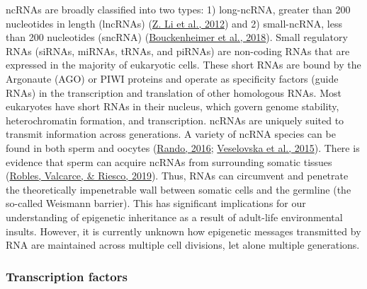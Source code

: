 \documentclass[12pt,twoside]{reedthesis}
\begin{document}
ncRNAs are broadly classified into two types: 1) long-ncRNA, greater
than 200 nucleotides in length (lncRNAs) (\protect\hyperlink{ref-li2012}{Z. Li et al., 2012}) and 2) small-ncRNA,
less than 200 nucleotides (sncRNA) (\protect\hyperlink{ref-bouckenheimer2018}{Bouckenheimer et al., 2018}). Small
regulatory RNAs (siRNAs, miRNAs, tRNAs, and piRNAs) are non-coding RNAs
that are expressed in the majority of eukaryotic cells. These short RNAs
are bound by the Argonaute (AGO) or PIWI proteins and operate as
specificity factors (guide RNAs) in the transcription and translation of
other homologous RNAs. Most eukaryotes have short RNAs in their nucleus,
which govern genome stability, heterochromatin formation, and
transcription. ncRNAs are uniquely suited to transmit information across
generations. A variety of ncRNA species can be found in both sperm and
oocytes (\protect\hyperlink{ref-rando2016}{Rando, 2016}; \protect\hyperlink{ref-veselovska2015}{Veselovska et al., 2015}). There is evidence that sperm can
acquire ncRNAs from surrounding somatic tissues (\protect\hyperlink{ref-robles2019}{Robles, Valcarce, \& Riesco, 2019}). Thus,
RNAs can circumvent and penetrate the theoretically impenetrable wall
between somatic cells and the germline (the so-called Weismann barrier).
This has significant implications for our understanding of epigenetic
inheritance as a result of adult-life environmental insults. However, it
is currently unknown how epigenetic messages transmitted by RNA are
maintained across multiple cell divisions, let alone multiple
generations.

\hypertarget{transcription-factors}{%
\subsubsection*{Transcription factors}\label{transcription-factors}}
\end{document}
